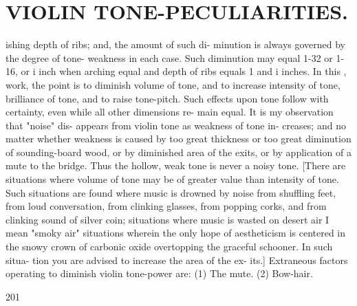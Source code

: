 \documentclass{article}
\begin{document}
\section*{VIOLIN TONE-PECULIARITIES.}
ishing depth of ribs; and, the amount of such di- minution is always governed by the degree of tone- weakness in each case. Such diminution may equal 1-32 or 1-16, or i inch when arching equal and depth of ribs equals 1 and i inches. In this , work, the point is to diminish volume of tone, and to increase intensity of tone, brilliance of tone, and to raise tone-pitch. Such effects upon tone follow with certainty, even while all other dimensions re- main equal. It is my observation that "noise" dis- appears from violin tone as weakness of tone in- creases; and no matter whether weakness is caused by too great thickness or too great diminution of sounding-board wood, or by diminished area of the exits, or by application of a mute to the bridge. Thus the hollow, weak tone is never a noisy tone. [There are situations where volume of tone may be of greater value than intensity of tone. Such situations are found where music is drowned by noise from shuffling feet, from loud conversation, from clinking glasses, from popping corks, and from clinking sound of silver coin; situations where music is wasted on desert air I mean "smoky air" situations wherein the only hope of aestheticism is centered in the snowy crown of carbonic oxide overtopping the graceful schooner. In such situa- tion you are advised to increase the area of the ex- its.] Extraneous factors operating to diminish violin tone-power are: (1) The mute. (2) Bow-hair.

201
\end{document}
